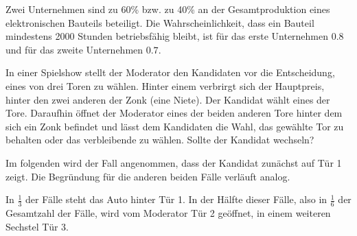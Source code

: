 \documentclass[10pt, a4paper]{exam}
\begin{document}
\begin{questions}
    \question Zwei Unternehmen sind zu 60\% bzw. zu 40\% an der Gesamtproduktion eines elektronischen Bauteils beteiligt. Die Wahrscheinlichkeit, dass ein Bauteil mindestens 2000 Stunden betriebsfähig bleibt, ist für das erste Unternehmen $0.8$ und für das zweite Unternehmen $0.7$.

    \question In einer Spielshow stellt der Moderator den Kandidaten vor die Entscheidung, eines von drei Toren zu wählen. Hinter einem verbrirgt sich der Hauptpreis, hinter den zwei anderen der Zonk (eine Niete). Der Kandidat wählt eines der Tore. Daraufhin öffnet der Moderator eines der beiden anderen Tore hinter dem sich ein Zonk befindet und lässt dem Kandidaten die Wahl, das gewählte Tor zu behalten oder das verbleibende zu wählen. Sollte der Kandidat wechseln?
    \begin{solution}
        Im folgenden wird der Fall angenommen, dass der Kandidat zunächst auf Tür 1 zeigt. Die Begründung für die anderen beiden Fälle verläuft analog.

        In $\frac{1}{3}$ der Fälle steht das Auto hinter Tür 1. In der Hälfte dieser Fälle, also in $\frac{1}{6}$ der Gesamtzahl der Fälle, wird vom Moderator Tür 2 geöffnet, in einem weiteren Sechstel Tür 3.


\end{solution}
\end{questions}
\end{document}
